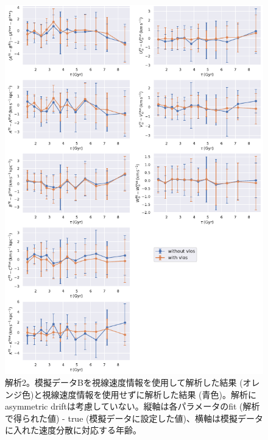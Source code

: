 \begin{figure}[htbp]
	\centering
	\includegraphics[width=15cm]{fig/Mock_vlos.pdf}
	\caption{解析2。模擬データBを視線速度情報を使用して解析した結果 (オレンジ色)と視線速度情報を使用せずに解析した結果 (青色)。解析にasymmetric driftは考慮していない。縦軸は各パラメータのfit (解析で得られた値) - true (模擬データに設定した値)、横軸は模擬データに入れた速度分散に対応する年齢。} \label{fig:Mock_vlos}
\end{figure}


